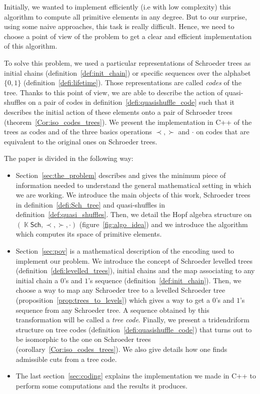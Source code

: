 \documentclass[a4paper,10pt]{amsart}
\DeclareMathOperator{\K}{\mathbb{K}}
\newcommand\Sch{\mathsf{Sch}}
\newcommand{\Schw}{Schroeder} %
\theoremstyle{definition}
\begin{document}
Initially, we wanted to implement efficiently (i.e  with low complexity) this algorithm to compute all primitive elements in any degree.
But to our surprise, using some naive approaches, this task is really difficult. Hence, we need to choose a point of view of the problem to get a clear and efficient implementation of this algorithm. 

To solve this problem, we used a particular representations of \Schw{} trees as initial chains (definition~\ref{def:init_chain}) or specific sequences over the alphabet $\{0,1\}$ (definition~\ref{defi:lifetime}). Those representations are called \emph{codes} of the tree. Thanks to this point of view, we are able to describe the action of quasi-shuffles on a pair of codes in definition~\ref{defi:quasishuffle_code} such that it describes the initial action of these elements onto a pair of \Schw{} trees (theorem~\ref{Cor:iso_codes_trees}). We present the implementation in {\ttfamily  C++} of the trees as codes and of the three basics operations $\prec, \succ$ and $\cdot$ on codes that are equivalent to the original ones on \Schw{} trees. 

The paper is divided in the following way:
\begin{itemize}
	\item Section~\ref{sec:the_problem} describes and gives the minimum piece of information needed to understand the general mathematical setting in which we are working. We introduce the main objects of this work, \Schw{} trees in definition~\ref{defi:Sch_tree} and quasi-shuffles in definition~\ref{def:quasi_shuffles}. Then, we detail the Hopf algebra structure on $(\K\Sch,\prec, \succ, \cdot)$ (figure~\ref{fig:algo_idea}) and we introduce the algorithm which computes its space of primitive elements.
	\item Section~\ref{sec:pov} is a mathematical description of the encoding used to implement our problem. We introduce the concept of \Schw{} levelled trees (definition~\ref{defi:levelled_trees}), initial chains and the map associating to any initial chain a $0$'s  and $1$'s sequence (definition~\ref{def:init_chain}). Then, we choose a way to map any \Schw{} tree to a levelled \Schw{} tree (proposition~\ref{prop:trees_to_levels}) which gives a way to get a $0$'s and $1$'s	sequence from any \Schw{} tree. A sequence obtained by this transformation will be called a \emph{tree code}. Finally, we present a tridendriform structure on tree codes (definition~\ref{defi:quasishuffle_code}) that turns out to be isomorphic to the one on \Schw{} trees (corollary~\ref{Cor:iso_codes_trees}). We also give details how one finds admissible cuts from a tree code.
	\item The last section~\ref{sec:coding} explains the implementation we made in {\ttfamily C++} to perform some computations and the results it produces. 
\end{itemize}
\end{document}
